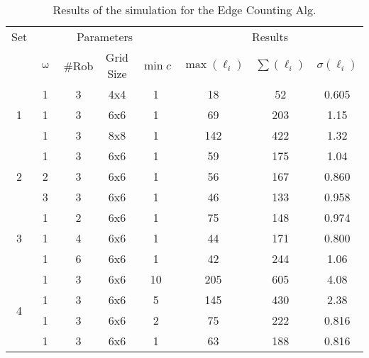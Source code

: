 \begin{table}[H]
\centering
\begin{tabular}{@{}cccccccc@{}}
\toprule
Set                & \multicolumn{4}{c}{Parameters}  & \multicolumn{3}{c}{Results}              \\ \cmidrule(lr){2-5} \cmidrule(lr){6-8}
                   & $\upomega$ & \#Rob & Grid Size & $\min c$ & $\max(\ell_i)$ & $\sum(\ell_i)$ & $\sigma(\ell_i)$ \\ \midrule
\multirow{3}{*}{1} & 1           & 3     & 4x4       &   1     &  18        &  52        &   0.605   \\
                             & 1           & 3     & 6x6       &   1     &   69      &  203       &   1.15    \\
                             & 1           & 3     & 8x8       &   1     &   142      &  422     &   1.32   \\ \midrule
\multirow{3}{*}{2} & 1           & 3     & 6x6       &   1     &   59      &  175       &  1.04     \\
                             & 2           & 3     & 6x6       &   1     &   56      &  167       &  0.860     \\
                             & 3           & 3     & 6x6       &   1     &   46      &  133       &  0.958     \\ \midrule
\multirow{3}{*}{3} & 1           & 2     & 6x6       &   1     &   75      &  148       &  0.974        \\
                             & 1           & 4     & 6x6       &   1     &  44      &   171     &    0.800           \\
                             & 1           & 6     & 6x6       &   1     &  42       &   244    &   1.06       \\ \midrule
\multirow{4}{*}{4} & 1           & 3     & 6x6       &   10   &  205     &  605     &    4.08   \\
                             & 1           & 3     & 6x6       &   5     &  145     &  430     &  2.38     \\
                             & 1           & 3     & 6x6       &   2     &  75      & 222      &  0.816        \\
                             & 1           & 3     & 6x6       &   1    &   63      & 188      &  0.816        \\ \bottomrule
\end{tabular}
\caption{Results of the simulation for the Edge Counting Alg.}
\label{tab:EC_results}
\end{table}


